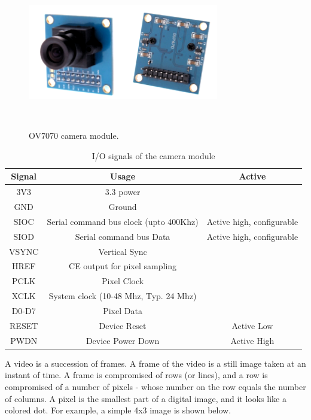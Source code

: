 \documentclass[a4paper]{article}
\begin{document}
\begin{figure}[H]
    \centering
    \includegraphics[scale=0.6]{images/camera.png}
    \caption{OV7070 camera module.}\\[1 in]
    \label{fig:my_label}
\end{figure}

\begin{table}[]
    \centering
    \begin{tabular}{|c|c|c|}
        \hline Signal & Usage & Active  \\\hline \hline
         3V3 & 3.3 power & \\\hline
         GND & Ground & \\\hline
         SIOC & Serial command bus clock (upto 400Khz) & Active high, configurable \\\hline
         SIOD & Serial command bus Data & Active high, configurable \\\hline
         VSYNC & Vertical Sync & \\\hline
         HREF & CE output for pixel sampling & \\\hline
         PCLK & Pixel Clock & \\\hline
         XCLK & System clock (10-48 Mhz, Typ. 24 Mhz) & \\\hline
         D0-D7 & Pixel Data & \\\hline
         RESET & Device Reset & Active Low\\\hline
         PWDN & Device Power Down & Active High\\\hline

    \end{tabular}
    \caption{I/O signals of the camera module}
    \label{tab:my_label}
\end{table}
A video is a succession of frames. A frame of the video is a still image taken at an instant of time. A frame is compromised of rows (or lines), and a row is compromised of a number of pixels - whose number on the row equals the number of columns. A pixel is the smallest part of a digital image, and it looks like a colored dot. For example, a simple 4x3 image is shown below.
\end{document}
